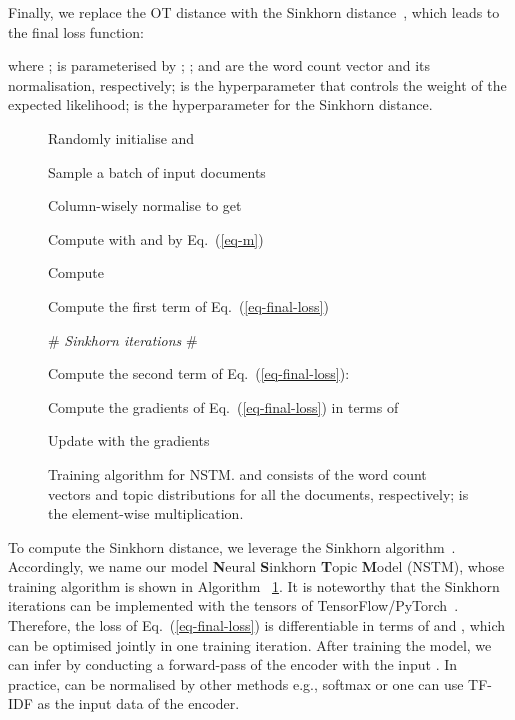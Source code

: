 \documentclass{article}
\begin{document}
Finally, we replace the OT distance with the Sinkhorn distance~\citep{cuturi2013sinkhorn}, which leads to the final loss function:

where ;  is parameterised by ; ;  and  are the word count vector and its normalisation, respectively;  is the hyperparameter that controls the weight of the expected likelihood;  is the hyperparameter for the Sinkhorn distance.

\begin{figure}
  \centering
  \begin{minipage}{0.9\textwidth}
    \centering
\begin{algorithm}[H]
\Output{}

Randomly initialise  and \;
{}
{
	Sample a batch of  input documents \;

	Column-wisely normalise  to get 

	Compute  with  and  by Eq.~(\ref{eq-m})\;

  Compute \;

  Compute the first term of Eq.~(\ref{eq-final-loss})\;

  \# \textit{Sinkhorn iterations} \#

  \;
  \;
	{
      \;
      \;
  }
  Compute the second term of Eq.~(\ref{eq-final-loss}): \;

  Compute the gradients of Eq.~(\ref{eq-final-loss}) in terms of \;

  Update  with the gradients\;
}
\caption{Training algorithm for NSTM.  and  consists of the word count vectors and topic distributions for all the documents, respectively;  is the element-wise multiplication.}
\label{alg}
\end{algorithm}
 \end{minipage}
\end{figure}

To compute the Sinkhorn distance, we leverage the Sinkhorn algorithm~\citep{cuturi2013sinkhorn}. Accordingly, we name our model \textbf{N}eural \textbf{S}inkhorn \textbf{T}opic \textbf{M}odel (NSTM), whose training algorithm is shown in Algorithm ~\ref{alg}. 
It is noteworthy that the Sinkhorn iterations can be implemented with the tensors of TensorFlow/PyTorch~\citep{patrini2020sinkhorn}.
Therefore, the loss of Eq.~(\ref{eq-final-loss}) is differentiable in terms of   and , which can be optimised jointly in one training iteration.
After training the model, we can infer  by conducting a forward-pass of the encoder  with the input . In practice,  can be normalised by other methods e.g., softmax or one can use TF-IDF as the input data of the encoder.
\end{document}
